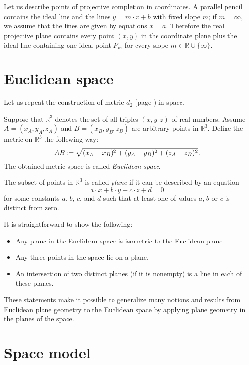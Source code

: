 Let us describe points of projective completion in coordinates.
A parallel pencil contains the ideal line and the lines $y=m\cdot x+b$ with fixed slope $m$;
if $m=\infty$, we assume that the lines are given by equations $x=a$.
Therefore the real projective plane contains every point $(x,y)$ in the coordinate plane plus the ideal line containing one ideal point $P_m$ for every slope $m\in\mathbb{R}\cup\{\infty\}$.




\section*{Euclidean space}

Let us repeat the construction of metric $d_2$ (page 
\pageref{def:d_2}) in space.

Suppose that $\mathbb{R}^3$ denotes the set of all triples $(x,y,z)$ of real numbers.
Assume $A=(x_A,y_A,z_A)$ and $B=(x_B,y_B,z_B)$ are arbitrary points in $\mathbb{R}^3$.
Define the metric on $\mathbb{R}^3$ the following way:
$$AB
:=
\sqrt{(x_A-x_B)^2+(y_A-y_B)^2+(z_A-z_B)^2}.$$
The obtained metric space is called \emph{Euclidean space}.

The subset of points in $\mathbb{R}^3$ is called \emph{plane} if it can be
described by an equation
$$a\cdot x+b\cdot y+c\cdot z+d=0$$ 
for some constants $a$, $b$, $c$, and $d$ such that at least one of values $a$, $b$ or $c$ is distinct from zero.

It is straightforward to show the following:
\begin{itemize}
 \item Any plane in the Euclidean space is isometric to the Euclidean plane.
 \item Any three points in the space lie on a plane.
 \item An intersection of two distinct planes (if it is nonempty) is a line in each of these planes.
\end{itemize}

These statements make it possible to generalize many notions and results from Euclidean plane geometry to the Euclidean space
by applying plane geometry in the planes of the space.

\section*{Space model}


